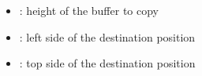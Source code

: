 \documentclass[letterpaper,10pt,english]{sphinxmanual}
\begin{document}
\begin{fulllineitems}
\begin{description}
\begin{itemize}
\item {} 
: height of the buffer to copy 

\item {} 
: left side of the destination position 

\item {} 
: top side of the destination position 

\end{itemize}

\end{description}


\end{fulllineitems}

\end{document}
